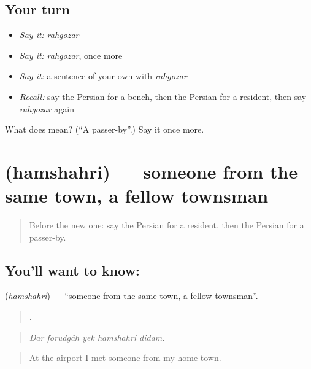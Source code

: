 \subsection*{Your turn}
\begin{itemize}
\raggedright
  \item \emph{Say it:} \emph{rahgozar}
  \item \emph{Say it:} \emph{rahgozar}, once more
  \item \emph{Say it:} a sentence of your own with \emph{rahgozar}
  \item \emph{Recall:} say the Persian for a bench, then the Persian for a resident, then say \emph{rahgozar} again
\end{itemize}

\begin{tcolorbox}[breakable,colback=teal!4,colframe=teal!35!black,title={Before you move on}]
What does  mean? (\textquotedblleft{}A passer-by\textquotedblright{}.) Say it once more.
\end{tcolorbox}
\section[\texorpdfstring{\fa{همشهری} (hamshahri)}{همشهری (hamshahri)}]{ (hamshahri) — someone from the same town, a fellow townsman}

\label{lesson:FA-C451-hamshahri}



\begin{quote}
Before the new one: say the Persian for a resident, then the Persian for a passer-by.
\end{quote}

\subsection*{You'll want to know: }
\textbf{} (\emph{hamshahri}) — \textquotedblleft{}someone from the same town, a fellow townsman\textquotedblright{}.

\begin{quote}
    .
\end{quote}

\begin{quote}
\emph{Dar forudgâh yek hamshahri didam.}
\end{quote}

\begin{quote}
At the airport I met someone from my home town.
\end{quote}

